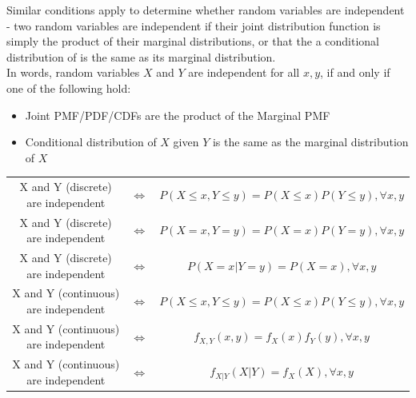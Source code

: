 \documentclass[11pt]{article}
\theoremstyle{definition}
\theoremstyle{remark}
\begin{document}
Similar conditions apply to determine whether random variables are independent - two random variables are independent if their joint distribution function is simply the product of their marginal distributions, or that the a conditional distribution of is the same as its marginal distribution. \\

In words, random variables $X$ and $Y$ are independent for all $x, y$, if and only if one of the following hold:
\begin{itemize}
	\itemsep -1mm
	\item Joint PMF/PDF/CDFs are the product of the Marginal PMF
	\item Conditional distribution of $X$ given $Y$ is the same as the marginal distribution of $X$
\end{itemize}

\begin{table}[htb]
	\begin{tabular}{ccc}
		X and Y (discrete) are independent  & $\Longleftrightarrow$ & $P(X \leq x, Y \leq y) = P(X \leq x)P(Y \leq y),  \forall x, y$ \\ 
		X and Y (discrete) are independent  & $\Longleftrightarrow$ & $P(X=x, Y=y) = P(X=x)P(Y=y),  \forall x, y$ \\ 
		X and Y (discrete) are independent  & $\Longleftrightarrow$ & $P(X=x | Y=y) = P(X=x),  \forall x, y$ \\ 
		X and Y (continuous) are independent  & $\Longleftrightarrow$ & $P(X \leq x, Y \leq y) = P(X \leq x)P(Y \leq y),  \forall x, y$ \\ 
		X and Y (continuous) are independent  & $\Longleftrightarrow$ & $f_{X, Y}(x, y) = f_X(x)f_Y(y), \forall x, y$ \\ 
		X and Y (continuous) are independent  & $\Longleftrightarrow$ & $f_{X|Y}(X|Y) = f_X(X), \forall x, y$ 
	\end{tabular}
\end{table}
\end{document}
